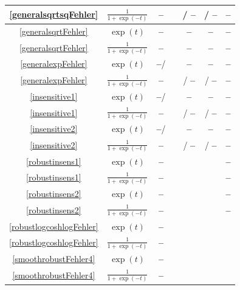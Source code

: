 \documentclass[10pt]{article}
\newcommand{\xmark}{\textbf{--}}
\begin{document}
{\begin{longtable}[c]{|c|c||c|c|c|c|c|}
		\eqref{generalsqrtsqFehler} &$\frac{1}{1+\exp(-t)}$ & \xmark & \checkmark & \checkmark / \xmark & \checkmark / \xmark & \xmark\\
		\hline
		\eqref{generalsqrtFehler} & $\exp(t)$ & \xmark & \checkmark& \xmark & \xmark & \xmark \\
		\eqref{generalsqrtFehler} & $\frac{1}{1+\exp(-t)}$ & \xmark & \checkmark & \xmark & \xmark & \xmark \\
		\hline
		\eqref{generalexpFehler} & $\exp(t)$ & \xmark / \checkmark & \checkmark& \xmark & \xmark & \xmark \\
		\eqref{generalexpFehler} & $\frac{1}{1+\exp(-t)}$ & \xmark & \checkmark & \checkmark / \xmark & \checkmark / \xmark & \xmark \\
		\hline
		\eqref{insensitive1} & $\exp(t)$ & \xmark / \checkmark & \checkmark & \xmark & \xmark & \xmark \\
		\eqref{insensitive1}  &$\frac{1}{1+\exp(-t)}$ & \xmark & \checkmark & \checkmark / \xmark & \checkmark / \xmark & \xmark \\ 
		\hline
		\eqref{insensitive2} & $\exp(t)$ & \xmark / \checkmark & \checkmark & \xmark & \xmark & \xmark \\
		\eqref{insensitive2}  &$\frac{1}{1+\exp(-t)}$ & \xmark & \checkmark & \checkmark / \xmark & \checkmark / \xmark & \xmark \\ 
		\hline
		\eqref{robustinsens1} & $\exp(t)$ & \xmark & \checkmark & \checkmark & \checkmark & \xmark \\
		\eqref{robustinsens1} &$\frac{1}{1+\exp(-t)}$ & \xmark & \checkmark & \checkmark & \checkmark & \xmark\\
		\hline
		\eqref{robustinsens2} & $\exp(t)$ & \xmark & \checkmark & \checkmark & \checkmark & \xmark \\
		\eqref{robustinsens2} &$\frac{1}{1+\exp(-t)}$ & \xmark & \checkmark & \checkmark & \checkmark & \xmark \\
		\hline
		\eqref{robustlogcoshlogFehler} & $\exp(t)$ & \xmark & \checkmark & \checkmark & \checkmark & \checkmark \\
		\eqref{robustlogcoshlogFehler} &$\frac{1}{1+\exp(-t)}$ & \xmark & \checkmark & \checkmark & \checkmark & \checkmark \\
		\hline
		\eqref{smoothrobustFehler4} & $\exp(t)$ & \xmark & \checkmark & \checkmark & \checkmark & \checkmark \\
		\eqref{smoothrobustFehler4} &$\frac{1}{1+\exp(-t)}$ & \xmark & \checkmark & \checkmark & \checkmark & \checkmark\\

\end{longtable}}
\end{document}
